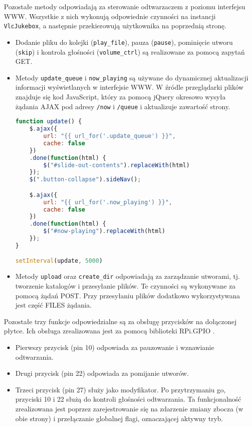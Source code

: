 \documentclass[10pt,a4paper]{article}
\begin{document}
Pozostałe metody odpowiadają za sterowanie odtwarzaczem z poziomu interfejsu WWW. Wszystkie
z nich wykonują odpowiednie czynności na instancji \texttt{VlcJukebox}, a następnie
przekierowują użytkownika na poprzednią stronę.

\begin{itemize}
	\item Dodanie pliku do kolejki (\texttt{play\_file}), pauza (\texttt{pause}),
		pominięcie utworu (\texttt{skip}) i kontrola głośności (\texttt{volume\_ctrl})
		są realizowane za pomocą zapytań GET.
	\item Metody \texttt{update\_queue} i \texttt{now\_playing} są używane do dynamicznej
		aktualizacji informacji wyświetlanych w interfejsie WWW. W źródle przeglądarki
		plików znajduje się kod JavaScript, który za pomocą jQuery okresowo wysyła żądania
		AJAX pod adresy \texttt{/now} i \texttt{/queue} i aktualizuje zawartość strony.
		\begin{lstlisting}[language=javascript, caption=Aktualizacja kolejki i obecnego utworu z pomocą jQuery]
function update() {
	$.ajax({
		url: "{{ url_for('.update_queue') }}",
		cache: false
	})
	.done(function(html) {
		$("#slide-out-contents").replaceWith(html)
	});
	$(".button-collapse").sideNav();

	$.ajax({
		url: "{{ url_for('.now_playing') }}",
		cache: false
	})
	.done(function(html) {
		$("#now-playing").replaceWith(html)
	});
}

setInterval(update, 5000)
		\end{lstlisting}
	\item Metody \texttt{upload} oraz \texttt{create\_dir} odpowiadają za zarządzanie utworami, tj.
		tworzenie katalogów i przesyłanie plików. Te czynności są wykonywane za pomocą żądań
		POST. Przy przesyłaniu plików dodatkowo wykorzystywana jest część FILES żądania.
\end{itemize}

Pozostałe trzy funkcje odpowiedzialne są za obsługę przycisków na dołączonej płytce. Ich obsługa
zrealizowana jest za pomocą biblioteki RPi.GPIO \cite{rpi-gpio}.

\begin{itemize}
	\item Pierwszy przycisk (pin 10) odpowiada za pauzowanie i wznawianie odtwarzania.
	\item Drugi przycisk (pin 22) odpowiada za pomijanie utworów.
	\item Trzeci przycisk (pin 27) służy jako modyfikator. Po przytrzymaniu go, przyciski 10 i 22
		służą do kontroli głośności odtwarzania. Ta funkcjonalność zrealizowana jest poprzez
		zarejestrowanie się na zdarzenie zmiany zbocza (w obie strony) i przełączanie
		globalnej flagi, oznaczającej aktywny tryb.
\end{itemize}
\end{document}

